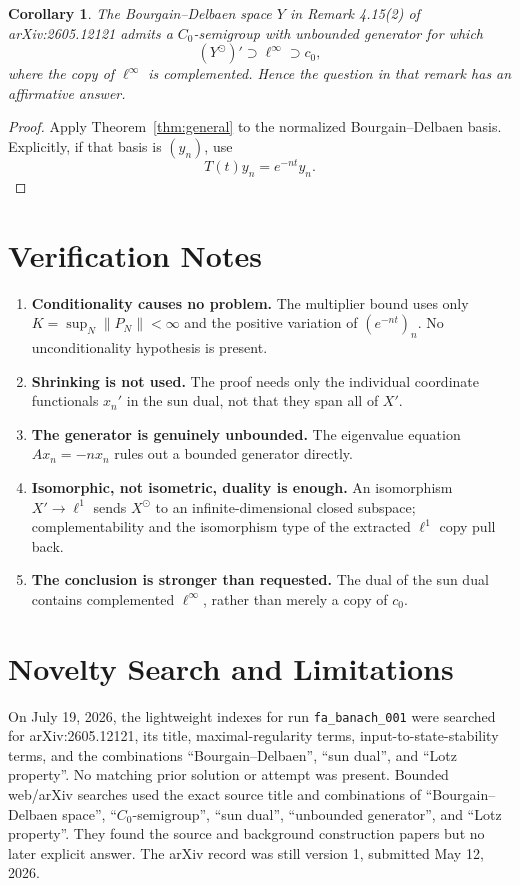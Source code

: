 \documentclass[11pt]{article}
\newtheorem{corollary}{Corollary}
\newcommand{\ellone}{\ell^{1}}
\newcommand{\ellinf}{\ell^{\infty}}
\begin{document}
\begin{corollary}
The Bourgain--Delbaen space \(Y\) in Remark 4.15(2) of
arXiv:2605.12121 admits a \(C_0\)-semigroup with unbounded generator for which
\[
  (Y^\odot)'\supset \ellinf\supset c_0,
\]
where the copy of \(\ellinf\) is complemented.  Hence the question in that
remark has an affirmative answer.
\end{corollary}

\begin{proof}
Apply Theorem~\ref{thm:general} to the normalized Bourgain--Delbaen basis.
Explicitly, if that basis is \((y_n)\), use
\[
  T(t)y_n=e^{-nt}y_n.
\]
\end{proof}

\section*{Verification Notes}

\begin{enumerate}
\item \textbf{Conditionality causes no problem.}  The multiplier bound uses
only \(K=\sup_N\|P_N\|<\infty\) and the positive variation of
\((e^{-nt})_n\).  No unconditionality hypothesis is present.
\item \textbf{Shrinking is not used.}  The proof needs only the individual
coordinate functionals \(x_n'\) in the sun dual, not that they span all of
\(X'\).
\item \textbf{The generator is genuinely unbounded.}  The eigenvalue equation
\(Ax_n=-nx_n\) rules out a bounded generator directly.
\item \textbf{Isomorphic, not isometric, duality is enough.}  An isomorphism
\(X'\to\ellone\) sends \(X^\odot\) to an infinite-dimensional closed subspace;
complementability and the isomorphism type of the extracted \(\ellone\) copy
pull back.
\item \textbf{The conclusion is stronger than requested.}  The dual of the
sun dual contains complemented \(\ellinf\), rather than merely a copy of
\(c_0\).
\end{enumerate}

\section*{Novelty Search and Limitations}

On July 19, 2026, the lightweight indexes for run
\texttt{fa\_banach\_001} were searched for arXiv:2605.12121, its title,
maximal-regularity terms, input-to-state-stability terms, and the combinations
``Bourgain--Delbaen'', ``sun dual'', and ``Lotz property''.  No matching prior
solution or attempt was present.  Bounded web/arXiv searches used the exact
source title and combinations of ``Bourgain--Delbaen space'',
``\(C_0\)-semigroup'', ``sun dual'', ``unbounded generator'', and ``Lotz
property''.  They found the source and background construction papers but no
later explicit answer.  The arXiv record was still version 1, submitted May
12, 2026.
\end{document}
